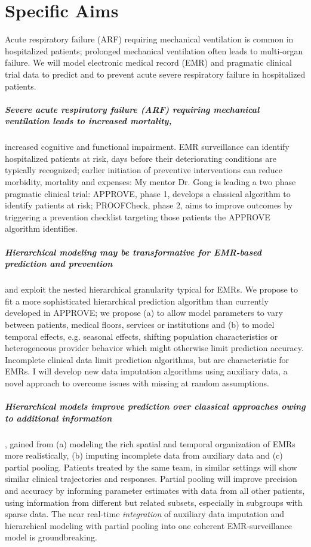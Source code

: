 \documentclass[11pt,notitlepage]{article}
\begin{document}
\section*{Specific Aims}
Acute respiratory failure (ARF) requiring mechanical ventilation is common in hospitalized patients; prolonged mechanical ventilation often leads to multi-organ failure. We will model electronic medical record (EMR) and pragmatic clinical trial data to predict and to prevent acute severe respiratory failure in hospitalized patients.

\subparagraph{Severe acute respiratory failure (ARF) requiring mechanical ventilation leads to increased mortality,} increased cognitive and functional impairment. EMR surveillance can identify hospitalized patients at risk, days before their deteriorating conditions are typically recognized; earlier initiation of preventive interventions can reduce morbidity, mortality and expenses: My mentor Dr. Gong is leading a two phase pragmatic clinical trial: APPROVE, phase 1, develops a classical algorithm to identify patients at risk; PROOFCheck, phase 2, aims to improve outcomes by triggering a prevention checklist targeting those patients the APPROVE algorithm identifies. 

\subparagraph{Hierarchical modeling may be transformative for EMR-based prediction and prevention} and exploit the nested hierarchical granularity typical for EMRs. We propose to fit a more sophisticated hierarchical prediction algorithm than currently developed in APPROVE; we propose (a) to allow model parameters to vary between patients, medical floors, services or institutions and (b) to model temporal effects, e.g. seasonal effects, shifting population characteristics or heterogeneous provider behavior which might otherwise limit prediction accuracy. Incomplete clinical data limit prediction algorithms, but are characteristic for EMRs. I will develop new data imputation algorithms using auxiliary data, a novel approach to overcome issues with missing at random assumptions. 

\subparagraph{Hierarchical models improve prediction over classical approaches owing to additional information}, gained from (a) modeling the rich spatial and temporal organization of EMRs more realistically, (b) imputing incomplete data from auxiliary data and (c) partial pooling. Patients treated by the same team, in similar settings will show similar clinical trajectories and responses. Partial pooling will improve precision and accuracy by informing parameter estimates with data from all other patients, using information from different but related subsets, especially in subgroups with sparse data. The near real-time \textit{integration} of auxiliary data imputation and hierarchical modeling with partial pooling into one coherent EMR-surveillance model is groundbreaking. 
\end{document}
